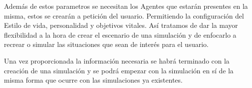 Además de estos parametros se necesitan los Agentes que estarán presentes en la misma, estos se crearán a petición del usuario. Permitiendo la configuración del Estilo de vida, personalidad y objetivos vitales. Así tratamos de dar la mayor flexibilidad a la hora de crear el escenario de una simulación y de enfocarlo a recrear o simular las situaciones que sean de interés para el usuario.

Una vez proporcionada la información necesaria se habrá terminado con la creación de una simulación y se podrá empezar con la simulación en sí de la misma forma que ocurre con las simulaciones ya existentes.